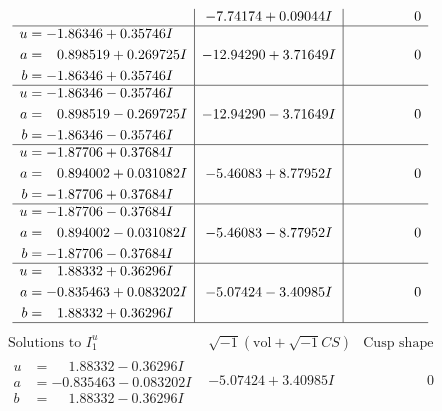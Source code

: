 \documentclass[1p]{elsarticle_modified}
\theoremstyle{definition}
\newcommand{\I}{\sqrt{-1}}
\begin{document}
$$\begin{array}{c|c|c}
 & -7.74174 + 0.09044 I & \phantom{-0.000000 } 0 \\ \hline\begin{aligned}
u &= -1.86346 + 0.35746 I \\
a &= \phantom{-}0.898519 + 0.269725 I \\
b &= -1.86346 + 0.35746 I\end{aligned}
 & -12.94290 + 3.71649 I & \phantom{-0.000000 } 0 \\ \hline\begin{aligned}
u &= -1.86346 - 0.35746 I \\
a &= \phantom{-}0.898519 - 0.269725 I \\
b &= -1.86346 - 0.35746 I\end{aligned}
 & -12.94290 - 3.71649 I & \phantom{-0.000000 } 0 \\ \hline\begin{aligned}
u &= -1.87706 + 0.37684 I \\
a &= \phantom{-}0.894002 + 0.031082 I \\
b &= -1.87706 + 0.37684 I\end{aligned}
 & -5.46083 + 8.77952 I & \phantom{-0.000000 } 0 \\ \hline\begin{aligned}
u &= -1.87706 - 0.37684 I \\
a &= \phantom{-}0.894002 - 0.031082 I \\
b &= -1.87706 - 0.37684 I\end{aligned}
 & -5.46083 - 8.77952 I & \phantom{-0.000000 } 0 \\ \hline\begin{aligned}
u &= \phantom{-}1.88332 + 0.36296 I \\
a &= -0.835463 + 0.083202 I \\
b &= \phantom{-}1.88332 + 0.36296 I\end{aligned}
 & -5.07424 - 3.40985 I & \phantom{-0.000000 } 0\\
 \hline 
 \end{array}$$\newpage$$\begin{array}{c|c|c}  
\text{Solutions to }I^u_{1}& \I (\text{vol} + \sqrt{-1}CS) & \text{Cusp shape}\\
 \hline 
\begin{aligned}
u &= \phantom{-}1.88332 - 0.36296 I \\
a &= -0.835463 - 0.083202 I \\
b &= \phantom{-}1.88332 - 0.36296 I\end{aligned}
 & -5.07424 + 3.40985 I & \phantom{-0.000000 } 0 \\ \hline\begin{aligned}

\end{aligned}
\end{array}$$
\end{document}
